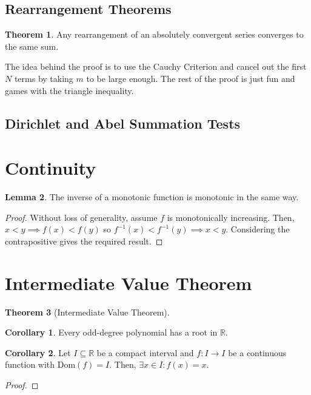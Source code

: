 \documentclass{article}
\theoremstyle{definition}
\newtheorem{theorem}{Theorem}[section]
\newtheorem{lemma}[theorem]{Lemma}
\newtheorem{corollary}{Corollary}[theorem]
\newcommand{\R}{\mathbb{R}}
\newcommand{\dom}{\text{Dom}}
\begin{document}
\subsection{Rearrangement Theorems}

\begin{theorem}
    Any rearrangement of an absolutely convergent series converges to the same sum.
\end{theorem}

The idea behind the proof is to use the Cauchy Criterion and cancel out the
first $N$ terms by taking $m$ to be large enough. The rest of the proof is just
fun and games with the triangle inequality.

\subsection{Dirichlet and Abel Summation Tests}

\section{Continuity}

\begin{lemma}
    The inverse of a monotonic function is monotonic in the same way.
\end{lemma}
\begin{proof}
    Without loss of generality, assume $f$ is monotonically increasing.
    Then, $x < y \implies f(x) < f(y)$ so $f^{-1}(x) < f^{-1}(y) \implies x < y$.
    Considering the contrapositive gives the required result.
\end{proof}

\newpage

\section{Intermediate Value Theorem}

\begin{theorem}[Intermediate Value Theorem]
    
\end{theorem}

\begin{corollary}
    Every odd-degree polynomial has a root in $\R$.
\end{corollary}

\begin{corollary}\label{fixed_point_ivt}
    Let $I \subseteq \R$ be a compact interval and $f:I \xrightarrow{} I$ be a continuous function 
    with $\dom(f) = I$. Then, $\exists x \in I: f(x) = x$.
\end{corollary}
\begin{proof}
    
\end{proof}
\end{document}
